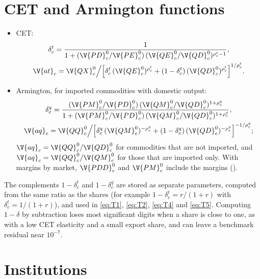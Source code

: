 \section{CET and Armington functions}\label{sec:cal-cet}

\begin{itemize}
\item CET:
\begin{gather*}
\delta^t_c = \frac{1}{1 + (\V{PD}^0_c / \V{PE}^0_c)\,(\V{QE}^0_c / \V{QD}^0_c)^{\rho^t_c - 1}},\\
\V{at}_c = \V{QX}^0_c \Big/ \Bigl[\delta^t_c\,(\V{QE}^0_c)^{\rho^t_c} + (1 - \delta^t_c)\,(\V{QD}^0_c)^{\rho^t_c}\Bigr]^{1/\rho^t_c}.
\end{gather*}
\item Armington, for imported commodities with domestic output:
\begin{gather*}
\delta^q_c = \frac{(\V{PM}^0_c / \V{PD}^0_c)\,(\V{QM}^0_c / \V{QD}^0_c)^{1 + \rho^q_c}}{1 + (\V{PM}^0_c / \V{PD}^0_c)\,(\V{QM}^0_c / \V{QD}^0_c)^{1 + \rho^q_c}},\\
\V{aq}_c = \V{QQ}^0_c \Big/ \Bigl[\delta^q_c\,(\V{QM}^0_c)^{-\rho^q_c} + (1 - \delta^q_c)\,(\V{QD}^0_c)^{-\rho^q_c}\Bigr]^{-1/\rho^q_c};
\end{gather*}
$\V{aq}_c = \V{QQ}^0_c / \V{QD}^0_c$ for commodities that are not imported, and
$\V{aq}_c = \V{QQ}^0_c / \V{QM}^0_c$ for those that are imported only. With
margins by market, $\V{PDD}^0_c$ and $\V{PM}^0_c$ include the margins
().
\end{itemize}
The complements $1 - \delta^t_c$ and $1 - \delta^q_c$ are stored as separate
parameters, computed from the same ratio as the shares (for example
$1 - \delta^t_c = r/(1 + r)$ with $\delta^t_c = 1/(1 + r)$), and used in
\eqref{eq:T1}, \eqref{eq:T2}, \eqref{eq:T4} and \eqref{eq:T5}. Computing
$1 - \delta$ by subtraction loses most significant digits when a share is
close to one, as with a low CET elasticity and a small export share, and can
leave a benchmark residual near $10^{-7}$.

\section{Institutions}\label{sec:cal-institutions}

